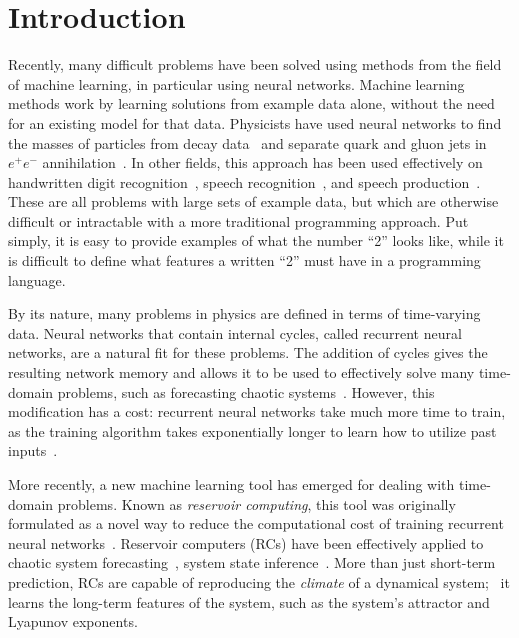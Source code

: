\chapter{Introduction}\label{ch:introduction}


Recently, many difficult problems have been solved using methods from
the field of machine learning, in particular using neural
networks. Machine learning methods work by learning solutions from
example data alone, without the need for an existing model for that
data.  Physicists have used neural networks to find the masses of
particles from decay data~\cite{lonnblad1992} and separate quark and
gluon jets in $e^+ e^-$ annihilation~\cite{csabai1991}.  In other
fields, this approach has been used effectively on handwritten digit
recognition~\cite{lecun1998,simard2003}, speech
recognition~\cite{hinton2012}, and speech production~\cite{oord2016}.
These are all problems with large sets of example data, but which are
otherwise difficult or intractable with a more traditional programming
approach. Put simply, it is easy to provide examples of what the
number ``\num{2}'' looks like, while it is difficult to define what
features a written ``\num{2}'' must have in a programming language.

By its nature, many problems in physics are defined in terms of
time-varying data. Neural networks that contain internal cycles,
called recurrent neural networks, are a natural fit for these
problems. The addition of cycles gives the resulting network memory
and allows it to be used to effectively solve many time-domain
problems, such as forecasting chaotic
systems~\cite{garcia-pedrero2010}. However, this modification has a
cost: recurrent neural networks take much more time to train, as the
training algorithm takes exponentially longer to learn how to utilize
past inputs~\cite{bengio1994,lukosevicius2009}.

More recently, a new machine learning tool has emerged for dealing
with time-domain problems.  Known as \emph{reservoir computing}, this
tool was originally formulated as a novel way to reduce the
computational cost of training recurrent neural
networks~\cite{lukosevicius2009}. Reservoir computers (RCs) have been
effectively applied to chaotic system
forecasting~\cite{jaeger1978,pathak2017}, system state
inference~\cite{lu2017}. More than just short-term prediction, RCs are
capable of reproducing the \emph{climate} of a dynamical
system;~\cite{pathak2017,haluszczynski2019} it learns the long-term
features of the system, such as the system's attractor and Lyapunov
exponents.

